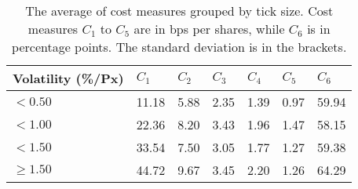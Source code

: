 \begin{table}
\centering
\caption{The average of cost measures grouped by tick size. Cost measures $C_1$ to $C_5$ are in bps per shares, while $C_6$ is in percentage points. The standard deviation is in the brackets.
}
\label{tbl:cost_report}
\begin{tabular}{lllllll}
\toprule
Volatility (\%/Px) &  $C_1$ & $C_2$ & $C_3$ & $C_4$ & $C_5$ &  $C_6$ \\
\midrule
           $<0.50$ &  11.18 &  5.88 &  2.35 &  1.39 &  0.97 &  59.94 \\
           $<1.00$ &  22.36 &  8.20 &  3.43 &  1.96 &  1.47 &  58.15 \\
           $<1.50$ &  33.54 &  7.50 &  3.05 &  1.77 &  1.27 &  59.38 \\
       $\geq 1.50$ &  44.72 &  9.67 &  3.45 &  2.20 &  1.26 &  64.29 \\
\bottomrule
\end{tabular}
\end{table}

